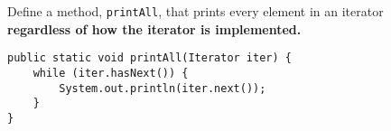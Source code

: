 \question Define a method, \texttt{printAll}, that prints every element in an iterator
\\
\textbf{regardless of how the iterator is implemented.}

\begin{solution}[1in]
\begin{lstlisting}
public static void printAll(Iterator iter) {
    while (iter.hasNext()) {
        System.out.println(iter.next());
    }
}
\end{lstlisting}
\end{solution}
